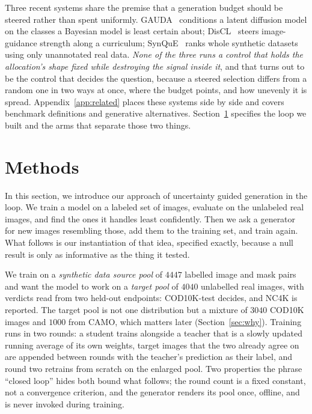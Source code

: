 \documentclass{article}
\begin{document}
Three recent systems share the premise that a generation budget should be steered rather than spent uniformly.
GAUDA~\citep{frisch2025gauda} conditions a latent diffusion model on the classes a Bayesian model is
least certain about; DisCL~\citep{liang2025discl} steers image-guidance strength along a curriculum;
SynQuE~\citep{chen2025synque} ranks whole synthetic datasets using only unannotated real data.
\textit{None of the three runs a control that holds the allocation's shape fixed while destroying
the signal inside it}, and that turns out to be the control that decides the question, because a
steered selection differs from a random one in two ways at once, where the budget points, and how
unevenly it is spread. Appendix~\ref{app:related} places these systems side by side and covers
benchmark definitions and generative alternatives. Section~\ref{sec:method} specifies the loop we
built and the arms that separate those two things.

\section{Methods}
\label{sec:method}
In this section, we introduce our approach of uncertainty guided generation in the loop. We train a model on a labeled set of images, evaluate on the unlabeled
real images, and find the ones it handles least confidently. Then we ask a generator for
new images resembling those, add them to the training set, and train again. What follows is our
instantiation of that idea, specified exactly, because a null result is only as informative as the
thing it tested.

We train on a \emph{synthetic data source pool} of $4447$ labelled image and mask pairs
and want the model to work on a \emph{target pool} of $4040$ unlabelled real images, with verdicts
read from two held-out endpoints: COD10K-test decides, and NC4K is reported. The target pool is not
one distribution but a mixture of $3040$ COD10K images and $1000$ from CAMO, which matters later
(Section~\ref{sec:why}). Training runs in two rounds: a student trains alongside a teacher that is a slowly updated running
average of its own weights, target images that the two already agree on are appended between rounds with
the teacher's prediction as their label, and round two retrains from scratch on the enlarged pool.
Two properties the phrase ``closed loop'' hides both bound what follows; the round count is a
fixed constant, not a convergence criterion, and the generator renders its pool once, offline, and
is never invoked during training.
\end{document}
